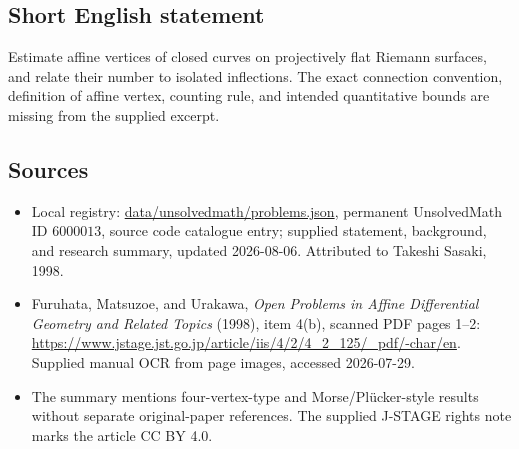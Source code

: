 \documentclass[11pt]{article}
\begin{document}
\subsection{Short English statement}
Estimate affine vertices of closed curves on projectively flat Riemann surfaces, and relate their number to isolated inflections. The exact connection convention, definition of affine vertex, counting rule, and intended quantitative bounds are missing from the supplied excerpt.
\subsection{Sources}
\begin{itemize}
\item Local registry: \url{data/unsolvedmath/problems.json}, permanent UnsolvedMath ID \(6000013\), source code catalogue entry; supplied statement, background, and research summary, updated 2026-08-06. Attributed to Takeshi Sasaki, 1998.
\item Furuhata, Matsuzoe, and Urakawa, \emph{Open Problems in Affine Differential Geometry and Related Topics} (1998), item 4(b), scanned PDF pages 1--2: \url{https://www.jstage.jst.go.jp/article/iis/4/2/4_2_125/_pdf/-char/en}. Supplied manual OCR from page images, accessed 2026-07-29.
\item The summary mentions four-vertex-type and Morse/Pl\"ucker-style results without separate original-paper references. The supplied J-STAGE rights note marks the article CC BY 4.0.
\end{itemize}
\end{document}
